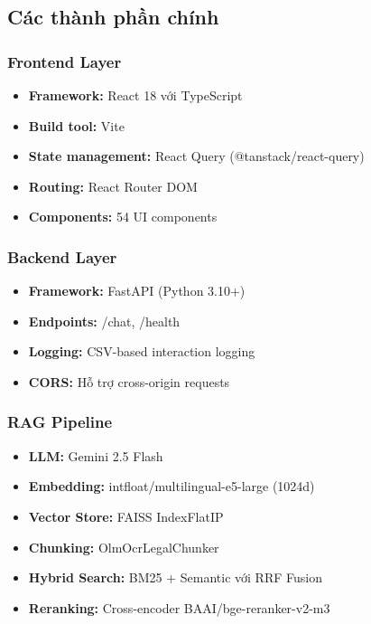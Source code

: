 \documentclass[../DoAn.tex]{subfiles}
\begin{document}
\subsection{Các thành phần chính}

\subsubsection{Frontend Layer}
\begin{itemize}
    \item \textbf{Framework:} React 18 với TypeScript
    \item \textbf{Build tool:} Vite
    \item \textbf{State management:} React Query (@tanstack/react-query)
    \item \textbf{Routing:} React Router DOM
    \item \textbf{Components:} 54 UI components
\end{itemize}

\subsubsection{Backend Layer}
\begin{itemize}
    \item \textbf{Framework:} FastAPI (Python 3.10+)
    \item \textbf{Endpoints:} /chat, /health
    \item \textbf{Logging:} CSV-based interaction logging
    \item \textbf{CORS:} Hỗ trợ cross-origin requests
\end{itemize}

\subsubsection{RAG Pipeline}
\begin{itemize}
    \item \textbf{LLM:} Gemini 2.5 Flash
    \item \textbf{Embedding:} intfloat/multilingual-e5-large (1024d)
    \item \textbf{Vector Store:} FAISS IndexFlatIP
    \item \textbf{Chunking:} OlmOcrLegalChunker
    \item \textbf{Hybrid Search:} BM25 + Semantic với RRF Fusion
    \item \textbf{Reranking:} Cross-encoder BAAI/bge-reranker-v2-m3
\end{itemize}
\end{document}
